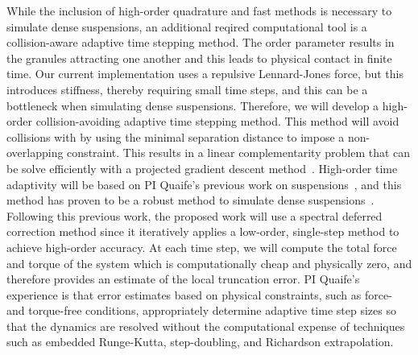 While the inclusion of high-order quadrature and fast methods is
necessary to simulate dense suspensions, an additional reqired
computational tool is a collision-aware adaptive time stepping method.
The order parameter results in the granules attracting one another and
this leads to physical contact in finite time. Our current
implementation uses a repulsive Lennard-Jones force, but this introduces
stiffness, thereby requiring small time steps, and this can be a
bottleneck when simulating dense suspensions. Therefore, we will develop
a high-order collision-avoiding adaptive time stepping method. This
method will avoid collisions with by using the minimal separation
distance to impose a non-overlapping constraint. This results in a
linear complementarity problem that can be solve efficiently with a
projected gradient descent method~\cite{Yan2019}. High-order time
adaptivity will be based on PI Quaife's previous work on
suspensions~\cite{qua-bir2016}, and this method has proven to be a
robust method to simulate dense suspensions~\cite{qua-vee-you2019,
kab-qua-bir2017, qua-gan-you2021}. Following this previous work, the
proposed work will use a spectral deferred correction method since it
iteratively applies a low-order, single-step method to achieve
high-order accuracy. At each time step, we will compute the total force
and torque of the system which is computationally cheap and physically
zero, and therefore provides an estimate of the local truncation error.
PI Quaife's experience is that error estimates based on physical
constraints, such as force- and torque-free conditions, appropriately
determine adaptive time step sizes so that the dynamics are resolved
without the computational expense of techniques such as embedded
Runge-Kutta, step-doubling, and Richardson extrapolation.
